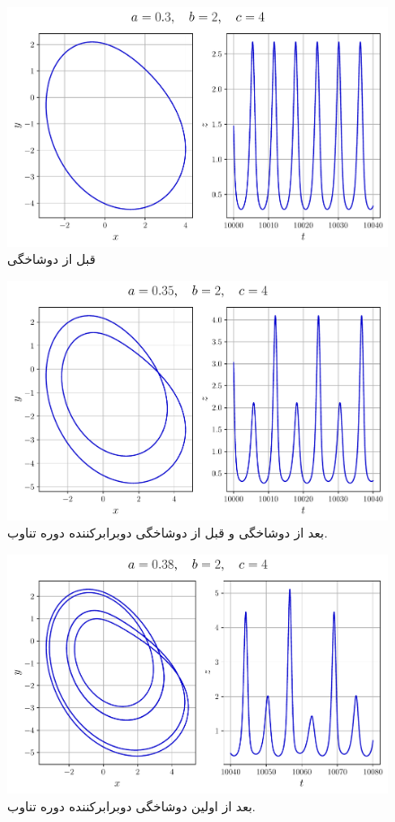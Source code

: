 \documentclass[12pt,a4paper]{article}
\begin{document}
	\subsection{}
	\begin{figure}[h!]
		\centering
		\includegraphics[width=\linewidth]{fig/12.3.1.normal}
		\caption{قبل از دوشاخگی }
	\end{figure}
	\begin{figure}[h!]
		\centering
		\includegraphics[width=\linewidth]{fig/12.3.1.hopf}
		\caption{بعد از دوشاخگی  و قبل از دوشاخگی دوبرابرکننده دوره تناوب.}
	\end{figure}
	\begin{figure}[h!]
		\centering
		\includegraphics[width=\linewidth]{fig/12.3.1.double}
		\caption{بعد از اولین دوشاخگی دوبرابرکننده دوره تناوب.}
	\end{figure}
\end{document}
